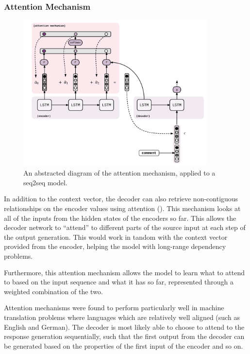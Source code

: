 \documentclass[12pt,twoside]{report}
\begin{document}
\subsubsection{Attention Mechanism}

\begin{figure}[!ht]
      
	\centering
	\includegraphics[width=100mm]{diagrams/seq2seq_attention_mechanism.pdf}
	\caption{An abstracted diagram of the attention mechanism, applied to a seq2seq model.\label{seq2seq_attn}}
\end{figure}

In addition to the context vector, the decoder can also retrieve non-contiguous relationships on the encoder values using attention (\cite{bahdanau_neural_2014}). This mechanism looks at all of the inputs from the hidden states of the encoders so far. This allows the decoder network to ``attend'' to different parts of the source input at each step of the output generation. This would work in tandom with the context vector provided from the encoder, helping the model with long-range dependency problems.

Furthermore, this attention mechanism allows the model to learn what to attend to based on the input sequence and what it has so far, represented through a weighted combination of the two.

Attention mechanisms were found to perform particularly well in machine translation problems where languages which are relatively well aligned (such as English and German). The decoder is most likely able to choose to attend to the response generation sequentially, such that the first output from the decoder can be generated based on the properties of the first input of the encoder and so on.
\end{document}
